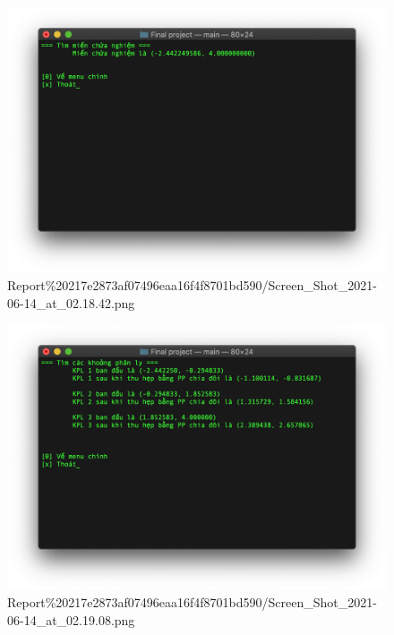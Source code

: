 \begin{figure}[htbp]
\centering
\includegraphics{Report 217e2873af07496eaa16f4f8701bd590/Screen_Shot_2021-06-14_at_02.18.42.png}
\caption{Report\%20217e2873af07496eaa16f4f8701bd590/Screen\_Shot\_2021-06-14\_at\_02.18.42.png}
\end{figure}

\begin{figure}[htbp]
\centering
\includegraphics{Report 217e2873af07496eaa16f4f8701bd590/Screen_Shot_2021-06-14_at_02.19.08.png}
\caption{Report\%20217e2873af07496eaa16f4f8701bd590/Screen\_Shot\_2021-06-14\_at\_02.19.08.png}
\end{figure}

